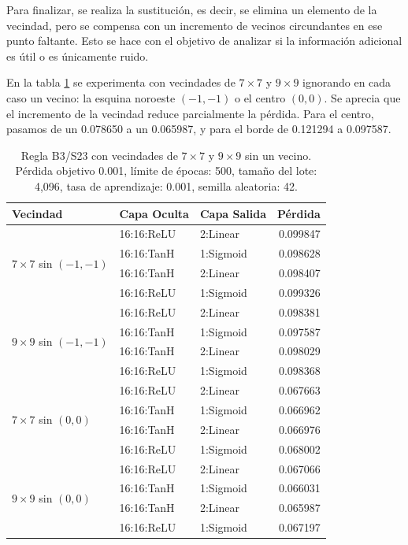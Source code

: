 Para finalizar, se realiza la sustitución, es decir, se elimina un elemento de la vecindad, pero se compensa con un incremento de vecinos circundantes en ese punto faltante. Esto se hace con el objetivo de analizar si la información adicional es útil o es únicamente ruido.

En la tabla \ref{tab:vecindad_reducida_ampliada} se experimenta con vecindades de $7 \times 7$ y $9 \times 9$ ignorando en cada caso un vecino: la esquina noroeste $(-1,-1)$ o el centro $(0,0)$. Se aprecia que el incremento de la vecindad reduce parcialmente la pérdida. Para el centro, pasamos de un 0.078650 a un 0.065987, y para el borde de 0.121294 a 0.097587.

\begin{table}[H]
	\centering
	\footnotesize
	\begin{tabular}{lllr}
		\toprule
		\textbf{Vecindad} & \textbf{Capa Oculta} & \textbf{Capa Salida} & \textbf{Pérdida} \\
		\midrule
		\multirow{4}{*}{$7\times7$ sin $(-1,-1)$} & 16:16:ReLU & 2:Linear & 0.099847 \\
		& 16:16:TanH & 1:Sigmoid & 0.098628 \\
		& 16:16:TanH & 2:Linear & 0.098407 \\
		& 16:16:ReLU & 1:Sigmoid & 0.099326 \\
		\midrule
		\multirow{4}{*}{$9\times9$ sin $(-1,-1)$} & 16:16:ReLU & 2:Linear & 0.098381 \\
		& 16:16:TanH & 1:Sigmoid & 0.097587 \\
		& 16:16:TanH & 2:Linear & 0.098029 \\
		& 16:16:ReLU & 1:Sigmoid & 0.098368 \\
		\midrule
		\multirow{4}{*}{$7\times7$ sin $(0,0)$} & 16:16:ReLU & 2:Linear & 0.067663 \\
		& 16:16:TanH & 1:Sigmoid & 0.066962 \\
		& 16:16:TanH & 2:Linear & 0.066976 \\
		& 16:16:ReLU & 1:Sigmoid & 0.068002 \\
		\midrule
		\multirow{4}{*}{$9\times9$ sin $(0,0)$} & 16:16:ReLU & 2:Linear & 0.067066 \\
		& 16:16:TanH & 1:Sigmoid & 0.066031 \\
		& 16:16:TanH & 2:Linear & 0.065987 \\
		& 16:16:ReLU & 1:Sigmoid & 0.067197 \\
		\bottomrule
	\end{tabular}
	\caption{Regla B3/S23 con vecindades de $7\times7$ y $9\times9$ sin un vecino. Pérdida objetivo 0.001, límite de épocas: 500, tamaño del lote: 4,096, tasa de aprendizaje: 0.001, semilla aleatoria: 42.}
	\label{tab:vecindad_reducida_ampliada}
\end{table}

